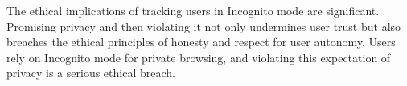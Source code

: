 The ethical implications of tracking users in Incognito mode are significant.
Promising privacy and then violating it not only undermines user trust but also breaches the ethical principles of honesty and respect for user autonomy.
Users rely on Incognito mode for private browsing, and violating this expectation of privacy is a serious ethical breach.